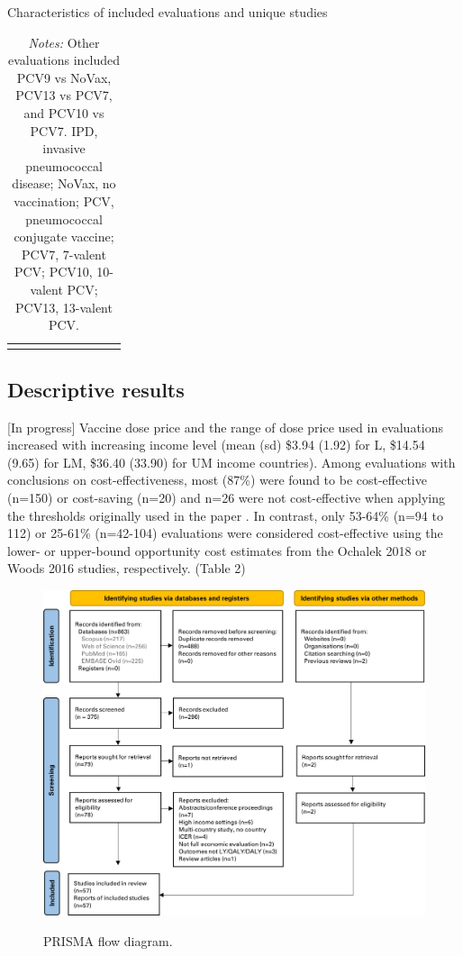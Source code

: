 \documentclass[12pt]{article}
\begin{document}
\begin{table}[H]
    \centering \singlespacing \small
    \caption{Characteristics of included evaluations and unique studies}
    \begin{tabular}{|L{2.8cm}|C{1.8cm}|C{1.3cm}|C{1cm}|C{1cm}|C{1cm}|C{1cm}|C{1cm}|C{1cm}|}
        \hline
    \end{tabular}
    \label{tab_evals_thresholds}
    \caption*{\footnotesize \textit{Notes:} Other evaluations included PCV9 vs NoVax, PCV13 vs PCV7, and PCV10 vs PCV7. IPD, invasive pneumococcal disease; NoVax, no vaccination; PCV, pneumococcal conjugate vaccine; PCV7, 7-valent PCV; PCV10, 10-valent PCV; PCV13, 13-valent PCV. 
}
\end{table}

\subsection{Descriptive results}
[In progress]
Vaccine dose price and the range of dose price used in evaluations increased with increasing income level (mean (sd) \$3.94 (1.92) for L, \$14.54 (9.65) for LM, \$36.40 (33.90)  for UM income countries). 
Among evaluations with conclusions on cost-effectiveness, most (87\%) were found to be cost-effective (n=150) or cost-saving (n=20) and n=26 were not cost-effective when applying the thresholds originally used in the paper . In contrast, only 53-64\% (n=94 to 112) or 25-61\% (n=42-104) evaluations were considered cost-effective using the lower- or upper-bound opportunity cost estimates from the Ochalek 2018 or Woods 2016 studies, respectively. (Table 2)


\begin{figure}[H]
    \centering
    \includegraphics[width=1\linewidth]{figures/prisma-flow-diagram.jpg}
    \caption{PRISMA flow diagram.}
    \label{fig:prisma-flow-diagram}
    \caption*{\footnotesize \textit{}}
\end{figure}
\end{document}
